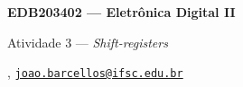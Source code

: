 



\usepackage[style=numeric, citestyle=ieee]{biblatex}




\begin{Large}
    \textbf{EDB203402 --- Eletrônica Digital II}
    
    Atividade 3 --- \textit{Shift-registers} \hfill {}
\end{Large}

\vspace{1ex}
\textbf{} , \href{mailto:joao.barcellos@ifsc.edu.br}{\texttt{joao.barcellos@ifsc.edu.br}}\\
\textbf{}

\vspace{2ex}

